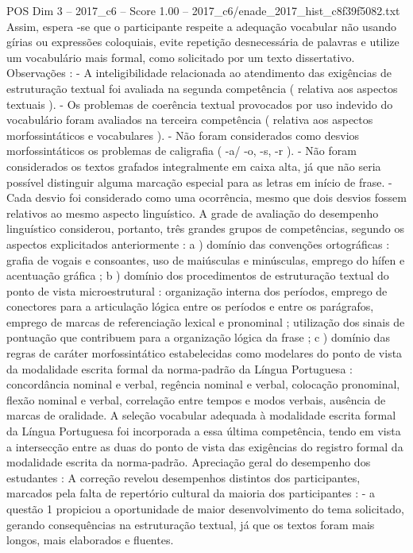 \begin{textsample}{POS Dim 3 – 2017\_c6 – Score 1.00 – 2017\_c6/enade\_2017\_hist\_c8f39f5082.txt}
Assim, espera -se que o participante respeite a adequação vocabular não usando gírias ou expressões coloquiais, evite repetição desnecessária de palavras e utilize um vocabulário mais formal, como solicitado por um texto dissertativo.
Observações : - A inteligibilidade relacionada ao atendimento das exigências de estruturação textual foi avaliada na segunda competência ( relativa aos aspectos textuais ). - Os problemas de coerência textual provocados por uso indevido do vocabulário foram avaliados na terceira competência ( relativa aos aspectos morfossintáticos e vocabulares ). - Não foram considerados como desvios morfossintáticos os problemas de caligrafia ( -a/ -o, -s, -r ). - Não foram considerados os textos grafados integralmente em caixa alta, já que não seria possível distinguir alguma marcação especial para as letras em início de frase. - Cada desvio foi considerado como uma ocorrência, mesmo que dois desvios fossem relativos ao mesmo aspecto linguístico.
A grade de avaliação do desempenho linguístico considerou, portanto, três grandes grupos de competências, segundo os aspectos explicitados anteriormente : a ) domínio das convenções ortográficas : grafia de vogais e consoantes, uso de maiúsculas e minúsculas, emprego do hífen e acentuação gráfica ; b ) domínio dos procedimentos de estruturação textual do ponto de vista microestrutural : organização interna dos períodos, emprego de conectores para a articulação lógica entre os períodos e entre os parágrafos, emprego de marcas de referenciação lexical e pronominal ; utilização dos sinais de pontuação que contribuem para a organização lógica da frase ; c ) domínio das regras de caráter morfossintático estabelecidas como modelares do ponto de vista da modalidade escrita formal da norma-padrão da Língua Portuguesa : concordância nominal e verbal, regência nominal e verbal, colocação pronominal, flexão nominal e verbal, correlação entre tempos e modos verbais, ausência de marcas de oralidade.
A seleção vocabular adequada à modalidade escrita formal da Língua Portuguesa foi incorporada a essa última competência, tendo em vista a intersecção entre as duas do ponto de vista das exigências do registro formal da modalidade escrita da norma-padrão.
Apreciação geral do desempenho dos estudantes : A correção revelou desempenhos distintos dos participantes, marcados pela falta de repertório cultural da maioria dos participantes : - a questão 1 propiciou a oportunidade de maior desenvolvimento do tema solicitado, gerando consequências na estruturação textual, já que os textos foram mais longos, mais elaborados e fluentes.

\end{textsample}

